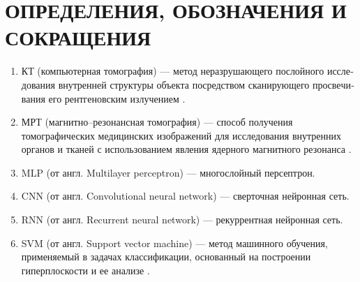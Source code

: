 \section*{ОПРЕДЕЛЕНИЯ, ОБОЗНАЧЕНИЯ И СОКРАЩЕНИЯ}

\begin{enumerate}[leftmargin=1.6\parindent]
\item КТ (компьютерная томография) --- ме­тод не­раз­ру­шаю­ще­го по­слой­но­го ис­сле­до­ва­ния внут­рен­ней струк­ту­ры объ­ек­та по­сред­ст­вом ска­ни­рую­ще­го про­све­чи­ва­ния его рент­ге­нов­ским из­лу­че­ни­ем \cite{kt}.
\item МРТ (магнитно--резонансная томография) --- способ получения томографических медицинских изображений для исследования внутренних органов и тканей с использованием явления ядерного магнитного резонанса \cite{mrt}.
\item MLP (от англ. Multilayer perceptron) --- многослойный персептрон.
\item CNN (от англ. Convolutional neural network) --- сверточная нейронная сеть. 
\item RNN (от англ. Recurrent neural network) --- рекуррентная нейронная сеть. 
\item SVM (от англ. Support vector machine) --- метод машинного обучения, применяемый в задачах классификации, основанный на построении гиперплоскости и ее анализе \cite{svm}.
\end{enumerate}